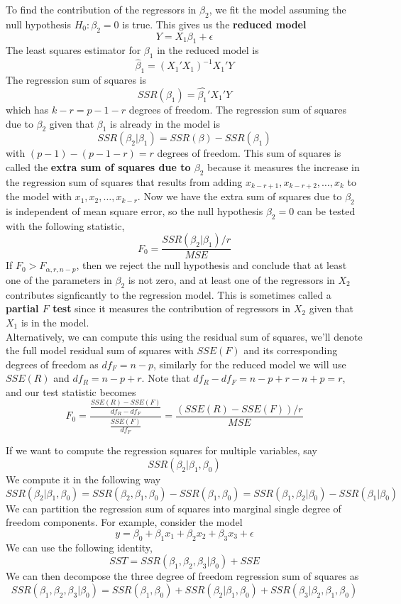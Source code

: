 To find the contribution of the regressors in $\beta_2$, we fit the model assuming the null hypothesis $H_0: \beta_2 = 0$ is true. This gives us the \textbf{reduced model}
\[Y = X_1\beta_1 + \epsilon\]
\noindent
The least squares estimator for $\beta_1$ in the reduced model is 
\[\hat{\beta}_1 = (X_1'X_1)^{-1}X_1'Y\]
The regression sum of squares is 
\[SSR(\beta_1) = \hat{\beta_1}'X_1'Y\]
which has $k-r = p - 1 - r$ degrees of freedom. The regression sum of squares due to $\beta_2$ given that $\beta_1$ is already in the model is 
\[SSR(\beta_2 | \beta_1) = SSR(\beta) - SSR(\beta_1)\]
with $(p-1) - (p - 1 -r) = r$ degrees of freedom. This sum of squares is called the \textbf{extra sum of squares due to $\beta_2$}  because it measures the increase in the regression sum of squares that results from adding $x_{k-r +1}, x_{k-r + 2}, \ldots, x_{k}$ to the model with $x_1,x_2, \ldots, x_{k-r}$. Now we have the extra sum of squares due to $\beta_2$ is independent of mean square error, so the null hypothesis $\beta_2=0$ can be tested with the following statistic,
\[F_0 = \frac{SSR(\beta_2|\beta_1)/r}{MSE}\]
 If $F_0 > F_{\alpha, r, n-p}$, then we reject the null hypothesis and conclude that at least one of the parameters in $\beta_2$ is not zero, and at least one of the regressors in $X_2$ contributes signficantly to the regression model. This is sometimes called a \textbf{partial $F$ test} since it measures the contribution of regressors in $X_2$ given that $X_1$ is in the model.\\

 Alternatively, we can compute this using the residual sum of squares, we'll denote the full model residual sum of squares with $SSE(F)$ and its corresponding degrees of freedom as $df_F = n-p$, similarly for the reduced model we will use $SSE(R)$ and $df_R = n-p+r$. Note that $df_R - df_F = n-p +r - n + p = r$, and our test statistic becomes 
 \[F_0 = \frac{\frac{SSE(R) - SSE(F)}{df_R - df_F}}{\frac{SSE(F)}{df_F}} = \frac{(SSE(R) - SSE(F))/r}{MSE}\]

 If we want to compute the regression squares for multiple variables, say 
 \[SSR(\beta_2| \beta_1, \beta_0)\]
 We compute it in the following way 
 \[SSR(\beta_2 | \beta_1, \beta_0) = SSR(\beta_2, \beta_1,\beta_0) - SSR(\beta_1,\beta_0) = SSR(\beta_1, \beta_2| \beta_0) - SSR(\beta_1|\beta_0)\]
 We can partition the regression sum of squares into marginal single degree of freedom components. For example, consider the model
 \[y = \beta_0 + \beta_1x_1 + \beta_2x_2 + \beta_3x_3 + \epsilon\]
 We can use the following identity, 
 \[SST = SSR(\beta_1, \beta_2, \beta_3 | \beta_0) + SSE\]
 We can then decompose the three degree of freedom regression sum of squares as
 \[SSR(\beta_1, \beta_2,\beta_3| \beta_0) = SSR(\beta_1,\beta_0) + SSR(\beta_2 | \beta_1, \beta_0) + SSR(\beta_3| \beta_2, \beta_1,\beta_0)\]
